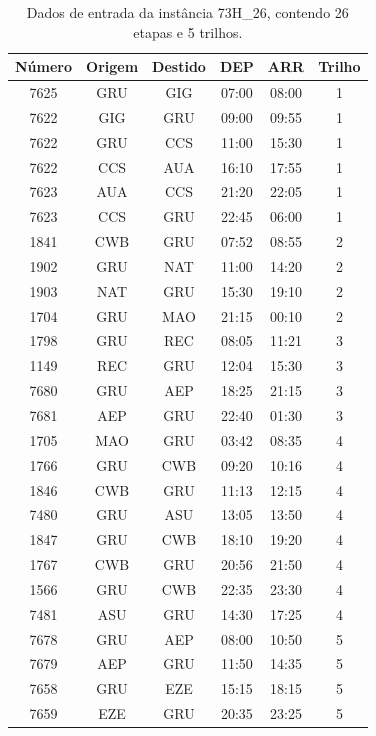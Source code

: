 \documentclass[12pt,a4paper]{article}
\begin{document}
\begin{table}[!htb]
	\begin{center}
		\begin{tabular}{|cccccc|}
			\hline 
			{\bf Número} & {\bf Origem} & {\bf Destido} & {\bf DEP} & {\bf ARR} & {\bf Trilho} \\
			\hline \hline
			7625 & GRU &	GIG	 &  07:00	 &  08:00  & 1 \\
			7622 & GIG &	GRU	 &  09:00	 &  09:55	 & 1 \\
			7622 & GRU &	CCS	 &  11:00	 &  15:30	 & 1 \\
			7622 & CCS &	AUA	 &  16:10	 &  17:55	 & 1 \\
			7623 & AUA &	CCS	 &  21:20	 &  22:05	 & 1 \\
			7623 & CCS &	GRU	 &  22:45	 &  06:00	 & 1 \\
			1841 & CWB &	GRU	 &  07:52	 &  08:55	 & 2 \\
			1902 & GRU &	NAT	 &  11:00	 &  14:20	 & 2 \\
			1903 & NAT &	GRU	 &  15:30	 &  19:10	 & 2 \\
			1704 & GRU &	MAO	 &  21:15	 &  00:10	 & 2 \\
			1798 & GRU &	REC	 &  08:05	 &  11:21	 & 3 \\
			1149 & REC &	GRU	 &  12:04	 &  15:30	 & 3 \\
			7680 & GRU &	AEP	 &  18:25	 &  21:15	 & 3 \\
			7681 & AEP &	GRU	 &  22:40	 &  01:30	 & 3 \\
			1705 & MAO &	GRU	 &  03:42	 &  08:35	 & 4 \\
			1766 & GRU &	CWB	 &  09:20	 &  10:16	 & 4 \\
			1846 & CWB &	GRU	 &  11:13	 &  12:15	 & 4 \\
			7480 & GRU &	ASU	 &  13:05	 &  13:50	 & 4 \\
			1847 & GRU &	CWB	 &  18:10	 &  19:20	 & 4 \\
			1767 & CWB &	GRU	 &  20:56	 &  21:50	 & 4 \\
			1566 & GRU &	CWB	 &  22:35	 &  23:30	 & 4 \\
			7481 & ASU &	GRU	 &  14:30	 &  17:25	 & 4 \\
			7678 & GRU &	AEP	 &  08:00	 &  10:50	 & 5 \\
			7679 & AEP &	GRU	 &  11:50	 &  14:35	 & 5 \\
			7658 & GRU &	EZE	 &  15:15	 &  18:15	 & 5 \\
			7659 & EZE &	GRU	 &  20:35	 &  23:25	 & 5 \\ \hline
	\end{tabular}
	\caption{Dados de entrada da instância 73H\_26, contendo 26 etapas e 5 trilhos.}
	\label{tab:73H_26}
	\end{center}
\end{table}
\end{document}
